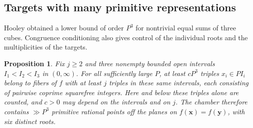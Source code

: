 \documentclass[11pt,letterpaper]{article}
\newtheorem{proposition}[proposition]{Proposition}
\theoremstyle{definition}
\begin{document}
\subsection{Targets with many primitive representations}
Hooley \cite[Theorem 3]{c3:hooleyk} obtained a lower bound of
order $P^3$ for nontrivial equal sums of three cubes. Congruence
conditioning also gives control of the individual roots and the
multiplicities of the targets.
\begin{proposition}\label{c3:manyprimitive}
Fix $j\ge2$ and three nonempty bounded open intervals
$I_1<I_2<I_3$ in $(0,\infty)$. For all sufficiently large $P$,
at least $c P^3$ triples $x_i\in P I_i$ belong to fibers of
$f$ with at least $j$ triples in these same intervals, each
consisting of pairwise coprime squarefree integers. Here and below
these triples alone are counted, and $c>0$ may depend on the
intervals and on $j$. The chamber therefore contains
$\gg P^3$ primitive rational points off the planes on $f(\mathbf x)
=f(\mathbf y)$, with six distinct roots.
\end{proposition}
\end{document}
